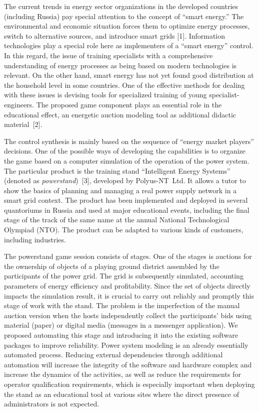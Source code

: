 \documentclass[
]{ceurart}
\begin{document}
The current trends in energy sector organizations in the developed countries (including Russia) pay special attention to the concept of ``smart energy.'' The environmental and economic situation forces them to optimize energy processes, switch to alternative sources, and introduce smart grids [1]. Information technologies play a special role here as implementers of a ``smart energy'' control. In this regard, the issue of training specialists with a comprehensive understanding of energy processes as being based on modern technologies is relevant. On the other hand, smart energy has not yet found good distribution at the household level in some countries. One of the effective methods for dealing with these issues is devising tools for specialized training of young specialist-engineers. The proposed game component plays an essential role in the educational effect, an energetic auction modeling tool as additional didactic material~[2].

The control synthesis is mainly based on the sequence of ``energy market players'' decisions. One of the possible ways of developing the capabilities is to organize the game based on a computer simulation of the operation of the power system. The particular product is the training stand ``Intelligent Energy Systems'' (denoted as \emph{powerstand})~[3], developed by Polyus-NT~Ltd. It allows a tutor to show the basics of planning and managing a real power supply network in a smart grid context. The product has been implemented and deployed in several quantoriums in Russia and used at major educational events, including the final stage of the track of the same name at the annual National Technological Olympiad (NTO). The product can be adapted to various kinds of customers, including industries.

The powerstand game session consists of stages. One of the stages is auctions for the ownership of objects of a playing ground district assembled by the participants of the power grid. The grid is subsequently simulated, accounting parameters of energy efficiency and profitability. Since the set of objects directly impacts the simulation result, it is crucial to carry out reliably and promptly this stage of work with the stand. The problem is the imperfection of the manual auction version when the hosts independently collect the participants' bids using material (paper) or digital media (messages in a messenger application). We proposed automating this stage and introducing it into the existing software packages to improve reliability. Power system modeling is an already essentially automated process. Reducing external dependencies through additional automation will increase the integrity of the software and hardware complex and increase the dynamics of the activities, as well as reduce the requirements for operator qualification requirements, which is especially important when deploying the stand as an educational tool at various sites where the direct presence of administrators is not expected.
\end{document}
